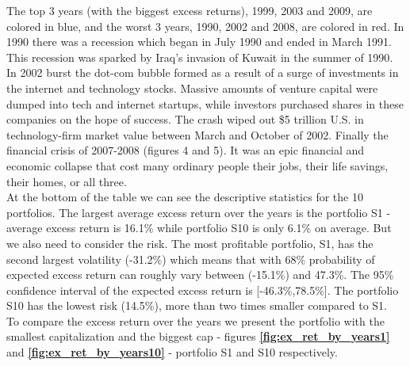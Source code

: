 \documentclass[11pt]{article}
\begin{document}
The top 3 years (with the biggest excess returns), 1999, 2003 and 2009, are colored in blue, and the worst 3 years, 1990, 2002 and 2008, are colored in red. 
In 1990 there was a recession which began in July 1990 and ended in March 1991. This recession was sparked by Iraq's invasion of Kuwait in the summer of 1990. 
In 2002 burst the dot-com bubble formed as a result of a surge of investments in the internet and technology stocks. Massive amounts of venture capital were dumped 
into tech and internet startups, while investors purchased shares in these companies on the hope of success. The crash wiped out \$5 trillion U.S. in technology-firm 
market value between March and October of 2002. Finally the financial crisis of 2007-2008 (figures 4 and 5). It was an epic financial and economic collapse that cost 
many ordinary people their jobs, their life savings, their homes, or all three.\\
At the bottom of the table we can see the descriptive statistics for the 10 portfolios. The largest average excess return over the years is the portfolio 
S1 - average excess return is 16.1\% while portfolio S10 is only 6.1\% on average. But we also need to consider the risk. The most profitable portfolio, 
S1, has the second largest volatility (-31.2\%) which means that with 68\% probability of expected excess return can roughly vary between (-15.1\%) and 47.3\%. 
The 95\% confidence interval of the expected excess return is [-46.3\%,78.5\%]. The portfolio S10 has the lowest risk (14.5\%), more than two times smaller compared to S1.\\
To compare the excess return over the years we present the portfolio with the smallest capitalization and the biggest cap - figures \textbf{\ref{fig:ex_ret_by_years1}} and 
\textbf{\ref{fig:ex_ret_by_years10}} - portfolio S1 and S10 respectively.
\end{document}
